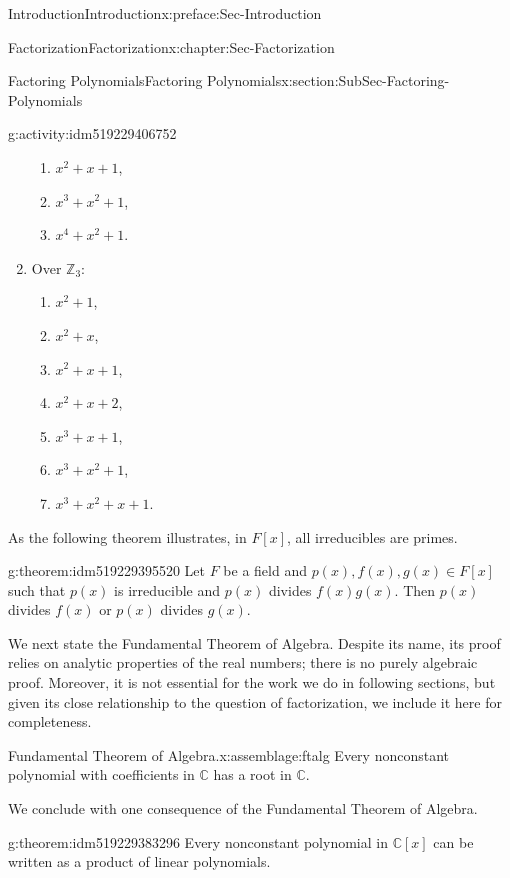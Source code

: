 \documentclass[oneside,10pt,]{book}
\numberwithin{equation}{section}
\def\C{{\mathbb C}}
\def\Z{{\mathbb Z}}
\begin{document}
\begin{preface}{Introduction}{}{Introduction}{}{}{x:preface:Sec-Introduction}
\begin{chapterptx}{Factorization}{}{Factorization}{}{}{x:chapter:Sec-Factorization}
\begin{sectionptx}{Factoring Polynomials}{}{Factoring Polynomials}{}{}{x:section:SubSec-Factoring-Polynomials}
\begin{activity}{}{g:activity:idm519229406752}
\begin{enumerate}
\begin{enumerate}
\item{}\(x^2 +x +1\),%
\item{}\(x^3 + x^2 + 1\),%
\item{}\(x^4 + x^2 + 1\).%
\end{enumerate}
\item{}Over \(\Z_3\):%
%
\begin{enumerate}
\item{}\(x^2 + 1\),%
\item{}\(x^2 + x\),%
\item{}\(x^2 +x +1\),%
\item{}\(x^2 +x +2\),%
\item{}\(x^3 + x +1\),%
\item{}\(x^3 + x^2 + 1\),%
\item{}\(x^3 + x^2 + x + 1\).%
\end{enumerate}
\end{enumerate}
\end{activity}
As the following theorem illustrates, in \(F[x]\), all irreducibles are primes.%
\begin{theorem}{}{}{g:theorem:idm519229395520}%
Let \(F\) be a field and \(p(x),f(x),g(x)\in F[x]\) such that \(p(x)\) is irreducible and \(p(x)\) divides \(f(x) g(x)\). Then \(p(x)\) divides \(f(x)\) or \(p(x)\) divides \(g(x)\).%
\end{theorem}
We next state the Fundamental Theorem of Algebra. Despite its name, its proof relies on analytic properties of the real numbers; there is no purely algebraic proof. Moreover, it is not essential for the work we do in following sections, but given its close relationship to the question of factorization, we include it here for completeness.%
\begin{assemblage}{Fundamental Theorem of Algebra.}{x:assemblage:ftalg}%
Every nonconstant polynomial with coefficients in \(\C\) has a root in \(\C\).%
\end{assemblage}
We conclude with one consequence of the Fundamental Theorem of Algebra.%
\begin{theorem}{}{}{g:theorem:idm519229383296}%
Every nonconstant polynomial in \(\C[x]\) can be written as a product of linear polynomials.%



\end{theorem}
\end{sectionptx}
\end{chapterptx}
\end{preface}
\end{document}
